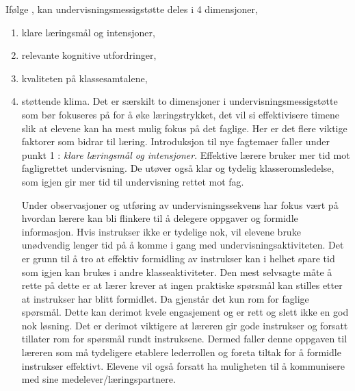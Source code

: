 \documentclass[main.tex]{subfiles}
\begin{document}
Ifølge , kan undervisningsmessigstøtte deles i 4 dimensjoner,
\begin{enumerate}
\item klare læringsmål og intensjoner,
\item relevante kognitive utfordringer,
\item kvaliteten på klassesamtalene,
\item støttende klima.
Det er særskilt to dimensjoner i undervisningsmessigstøtte som bør fokuseres på for å øke læringstrykket, 
det vil si effektivisere timene slik at elevene kan ha mest mulig fokus på det faglige.
Her er det flere viktige faktorer som bidrar til læring. Introduksjon til nye fagtemaer faller 
under punkt 1 : \emph{klare læringsmål og intensjoner}. Effektive lærere bruker mer tid mot 
fagligrettet undervisning. De utøver også klar og tydelig klasseromsledelse, som igjen gir mer tid 
til undervisning rettet mot fag. 



Under observasjoner og utføring av undervisningssekvens har fokus vært på hvordan lærere kan bli 
flinkere til å delegere oppgaver og formidle informasjon. Hvis instrukser ikke er tydelige nok, vil 
elevene bruke unødvendig lenger tid på å komme i gang med undervisningsaktiviteten. Det er grunn 
til å tro at effektiv formidling av instrukser kan i helhet spare tid som igjen kan brukes i andre 
klasseaktiviteter. Den mest selvsagte måte å rette på dette er at lærer krever at ingen praktiske
spørsmål kan stilles etter at instrukser har blitt formidlet. Da gjenstår det kun rom for faglige 
spørsmål. Dette kan derimot kvele engasjement og er rett og slett ikke en god nok løsning. Det er 
derimot viktigere at læreren gir gode instrukser og forsatt tillater rom for spørsmål rundt 
instruksene. Dermed faller denne oppgaven til læreren som må tydeligere etablere lederrollen og 
foreta tiltak for å formidle instrukser effektivt. Elevene vil også forsatt ha muligheten til å 
kommunisere med sine medelever/læringspartnere.


\end{enumerate}
\end{document}
